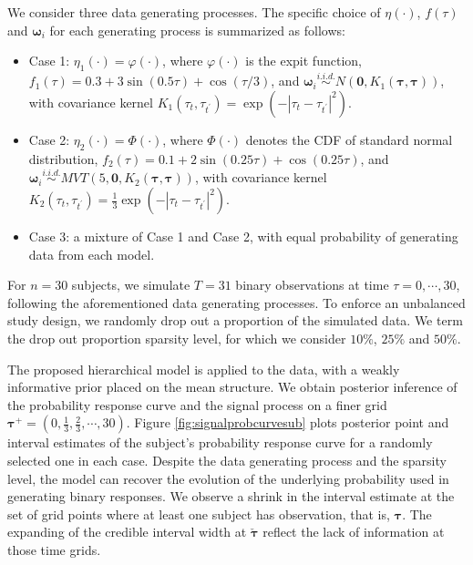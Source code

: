 We consider three data generating processes. The specific choice of $\eta(\cdot)$, $f(\tau)$ and $\boldsymbol{\omega}_i$ for each generating process is summarized as follows:
\begin{itemize}
\item Case 1: $\eta_1(\cdot)=\varphi(\cdot)$, where $\varphi(\cdot)$ is the expit function, $f_1(\tau)=0.3+3\sin(0.5\tau)+\cos(\tau/3)$, and $\boldsymbol{\omega}_i\stackrel{i.i.d.}{\sim} N(\mathbf{0},K_1(\boldsymbol{\tau},\boldsymbol{\tau}))$, with covariance kernel $K_1(\tau_{t},\tau_{t^{\prime}})=\exp(-|\tau_t-\tau_{t^{\prime}}|^2)$.
\item Case 2: $\eta_2(\cdot)=\Phi(\cdot)$, where $\Phi(\cdot)$ denotes the CDF of standard normal distribution, $f_2(\tau)=0.1+2\sin(0.25\tau)+\cos(0.25\tau)$, and $\boldsymbol{\omega}_i\stackrel{i.i.d.}{\sim} MVT(5,\mathbf{0},K_2(\boldsymbol{\tau},\boldsymbol{\tau}))$, with covariance kernel $K_2(\tau_{t},\tau_{t^{\prime}})=\frac{1}{3}\exp(-|\tau_t-\tau_{t^{\prime}}|^2)$.
\item Case 3: a mixture of Case 1 and Case 2, with equal probability of generating data from each model. 
\end{itemize}

For $n=30$ subjects, we simulate $T=31$ binary observations at time $\tau=0,\cdots,30$, following the aforementioned data generating processes. To enforce an unbalanced study design, we randomly drop out a proportion of the simulated data. We term the drop out proportion sparsity level, for which we consider $10\%$, $25\%$ and $50\%$. 

The proposed hierarchical model is applied to the data, with a weakly informative prior placed on the mean structure. We obtain posterior inference of the probability response curve and the signal process on a finer grid $\boldsymbol{\tau}^+=(0,\frac{1}{3},\frac{2}{3},\cdots,30)$. Figure \ref{fig:signalprobcurvesub} plots posterior point and interval estimates of the subject's probability response curve for a randomly selected one in each case. Despite the data generating process and the sparsity level, the model can recover the evolution of the underlying probability used in generating binary responses. We observe a shrink in the interval estimate at the set of grid points where at least one subject has observation, that is, $\boldsymbol{\tau}$. The expanding of the credible interval width at $\check{\boldsymbol{\tau}}$ reflect the lack of information at those time grids.   

